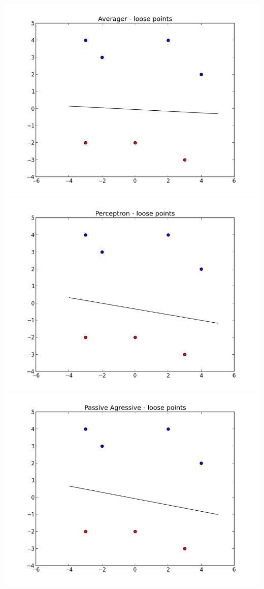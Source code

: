 \documentclass{article}
\begin{document}
\begin{enumerate}
\includegraphics[width=\linewidth/3]{../Plots/AvgLoo} \includegraphics[width=\linewidth/3]{../Plots/PerLoo} \includegraphics[width=\linewidth/3]{../Plots/PaLoo} \\

\end{enumerate}
\end{document}
